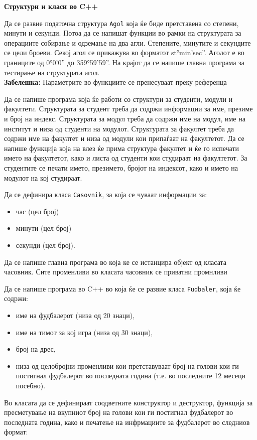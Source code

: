 \documentclass[12pt,a4paper]{exam}
\begin{document}
\pagestyle{headandfoot}
\headrule
{}
\begin{center}
\Large{\textbf{Структури и класи во C++}}
\end{center}
\begin{questions}

\question
Да се развие податочна структура \texttt{Agol} која ќе биде претставена со степени, минути и
секунди. Потоа да се напишат функции во рамки на структурата за операциите собирање и
одземање на два агли. Степените, минутите и секундите се цели броеви. Секој агол се
прикажува во форматот st°min’sec”. Аголот е во границите од 0°0’0” до 359°59’59”. На
крајот да се напише главна програма за тестирање на структурата агол.\\

\textbf{Забелешка:} Параметрите во функциите се пренесуваат преку референца


\question
Да се напише програма која ќе работи со структури за студенти, модули и
факултети. Структурата за студент треба да содржи информации за име, презиме и број на индекс.
Структурата за модул треба да содржи име на модул, име на институт и низа од студенти на
модулот. Структурата за факултет треба да содржи име на факултет и низа од модули кои
припаѓаат на факултетот.
Да се напише функција која на влез ќе прима структура факултет и ќе го испечати името на
факултетот, како и листа од студенти кои студираат на факултетот. За студентите се печати
името, презимето, бројот на индексот, како и името на модулот на кој студираат.


\question
Да се дефинира класа \texttt{Casovnik}, за која се чуваат информации за:
\begin{itemize}
  \item час (цел број)
  \item минути (цел број)
  \item секунди (цел број).   
\end{itemize}

Да се напише главна програма во која ке се истанцира објект од класата часовник.
Сите променливи во класата часовник се приватни промнливи

\question
Да се напише програма во C++ во која ќе се развие класа \texttt{Fudbaler}, која
ќе содржи:
\begin{itemize}
  \item име на фудбалерот (низа од 20 знаци),
  \item име на тимот за кој игра (низа од 30 знаци),
  \item број на дрес,
  \item низа од целобројни променливи кои претставуваат број на голови кои
ги постигнал фудбалерот во последната година (т.е. во последните 12 месеци
посебно).
\end{itemize}
Во класата да се дефинираат соодветните конструктор и деструктор, функција за
пресметување на вкупниот број на голови кои ги постигнал фудбалерот во
последната година, како и печатење на инфрмациите за фудбалерот во следниов формат:


\end{questions}
\end{document}
